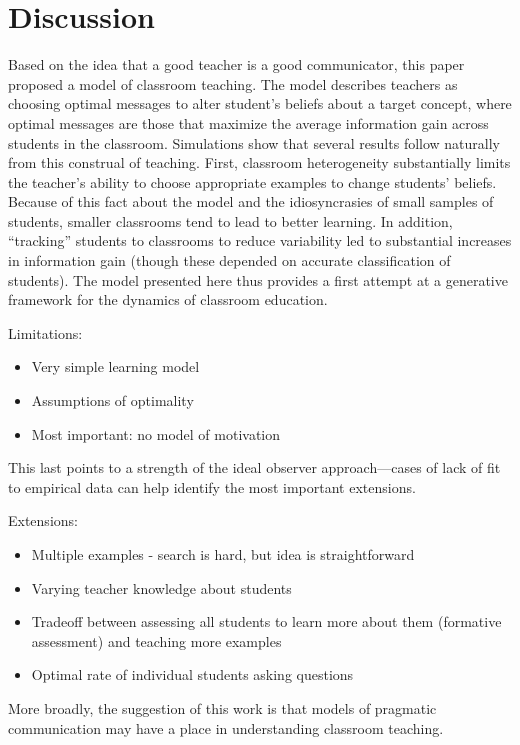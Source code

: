 \documentclass[10pt,letterpaper]{article}
\begin{document}
\section{Discussion}

Based on the idea that a good teacher is a good communicator, this paper proposed a model of classroom teaching. The model describes teachers as choosing optimal messages to alter student's beliefs about a target concept, where optimal messages are those that maximize the average information gain across students in the classroom. Simulations show that several results follow naturally from this construal of teaching. First, classroom heterogeneity substantially limits the teacher's ability to choose appropriate examples to change students' beliefs. Because of this fact about the model and the idiosyncrasies of small samples of students, smaller classrooms tend to lead to better learning. In addition, ``tracking'' students to classrooms to reduce variability led to substantial increases in information gain (though these depended on accurate classification of students). The model presented here thus provides a first attempt at a generative framework for the dynamics of classroom education. 


Limitations:
\begin{itemize}
\item Very simple learning model
\item Assumptions of optimality
\item Most important: no model of motivation
\end{itemize}
\noindent This last points to a strength of the ideal observer approach---cases of lack of fit to empirical data can help identify the most important extensions. 

Extensions:
\begin{itemize}
\item Multiple examples - search is hard, but idea is straightforward
\item Varying teacher knowledge about students
\item Tradeoff between assessing all students to learn more about them (formative assessment) and teaching more examples
\item Optimal rate of individual students asking questions
\end{itemize}

More broadly, the suggestion of this work is that models of pragmatic communication may have a place in understanding classroom teaching. 
\end{document}
